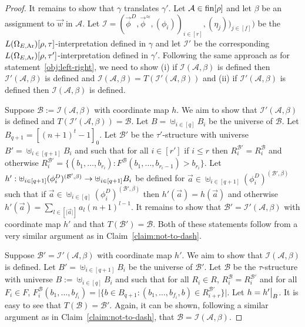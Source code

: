 \documentclass[../main/thesis.tex]{subfiles}
\begin{document}
\begin{proof}
  It remains to show that $\gamma$ translates $\gamma'$. Let $\mathcal{A} \in
  \text{\upshape fin}[\rho]$ and let $\beta$ be an assignment to $\vec{w}$ in $\mathcal{A}$.
  Let $\mathcal{I} = (\vec{\phi}^D, \vec{\phi}^{\approx}, (\phi_i))_{i \in [r]},
  (\eta_j))_{j \in [f]})$ be the $L(\Omega_{E, \text{\upshape Ar}})[\rho, \tau]$-interpretation
  defined in $\gamma$ and let $\mathcal{I}'$ be the corresponding $L(\Omega_{E,
    \text{\upshape Ar}})[\rho, \tau']$-interpretation defined in $\gamma'$. Following the same
  approach as for statement~\ref{obj:left-right}, we need to show (i) if
  $\mathcal{I}(\mathcal{A}, \beta)$ is defined then $\mathcal{I}'(\mathcal{A},
  \beta)$ is defined and $\mathcal{I}(\mathcal{A}, \beta) =
  T(\mathcal{I}'(\mathcal{A}, \beta))$ and (ii) if $\mathcal{I}'(\mathcal{A},
  \beta)$ is defined then $\mathcal{I}(\mathcal{A}, \beta)$ is defined.

  Suppose $\mathcal{B} := \mathcal{I}(\mathcal{A}, \beta)$ with coordinate map
  $h$. We aim to show that $\mathcal{I}'(\mathcal{A}, \beta)$ is defined and
  $T(\mathcal{I}'(\mathcal{A}, \beta)) = \mathcal{B}$. Let $B = \uplus_{i \in
    [q]}B_i$ be the universe of $\mathcal{B}$. Let $B_{q + 1} = [(n + 1)^{t} -
  1]_0$. Let $\mathcal{B}'$ be the $\tau'$-structure with universe $B' =
  \uplus_{i \in [q+1]} B_i$ and such that for all $i \in [r']$ if $i \leq r$
  then $R^{\mathcal{B}'}_i = R^{\mathcal{B}}_i$ and otherwise
  $R^{\mathcal{B}'}_i = \{(b_1, \ldots, b_{r_i} ) : F^{\mathcal{B}} (b_1,
  \ldots, b_{r_i - 1}) > b_{r_i}\}$. Let $h' : \uplus_{i \in [q +
    1]}(\phi^D_i)^{(\mathcal{B}', \beta)} \rightarrow \uplus_{i \in [q+1]} B_i$ be
  defined for $\vec{a} \in \uplus_{i \in [q + 1]}(\phi^D_i)^{(\mathcal{B}',
    \beta)}$ such that if $\vec{a} \in \uplus_{i \in
    [q]}(\phi^D_i)^{(\mathcal{B}', \beta)}$ then $h'(\vec{a}) = h(\vec{a})$ and
  otherwise $h'(\vec{a}) = \sum_{l \in [\vert \vec{a} \vert]} a_l (n + 1)^{l -
    1}$. It remains to show that $\mathcal{B}' = \mathcal{I}'(\mathcal{A},
  \beta)$ with coordinate map $h'$ and that $T(\mathcal{B}') = \mathcal{B}$.
  Both of these statements follow from a very similar argument as in
  Claim~\ref{claim:not-to-dash}.

  Suppose $\mathcal{B}' = \mathcal{I}'(\mathcal{A}, \beta)$ with coordinate map
  $h'$. We aim to show that $\mathcal{I}(\mathcal{A}, \beta)$ is defined. Let
  $B' = \uplus_{i \in [q+1]} B_i$ be the universe of $\mathcal{B}'$. Let
  $\mathcal{B}$ be the $\tau$-structure with universe $B := \uplus_{i \in [q]}
  B_i$ and such that for all $R_i \in R$, $R^{\mathcal{B}}_i =
  R^{\mathcal{B}'}_i$ and for all $F_i \in F$, $F^{\mathcal{B}}_i (b_1, \ldots,
  b_{f_i})= \vert \{b \in B_{q + 1} : (b_1, \ldots, b_{f_i}, b) \in
  R^{\mathcal{B}'}_{i + r}\}\vert$. Let $h = \restr{h'}{B}$. It is easy to see
  that $T(\mathcal{B}) = \mathcal{B}'$. Again, it can be shown, following a
  similar argument as in Claim~\ref{claim:not-to-dash}, that $\mathcal{B} =
  \mathcal{I}(\mathcal{A}, \beta)$.


\end{proof}
\end{document}
